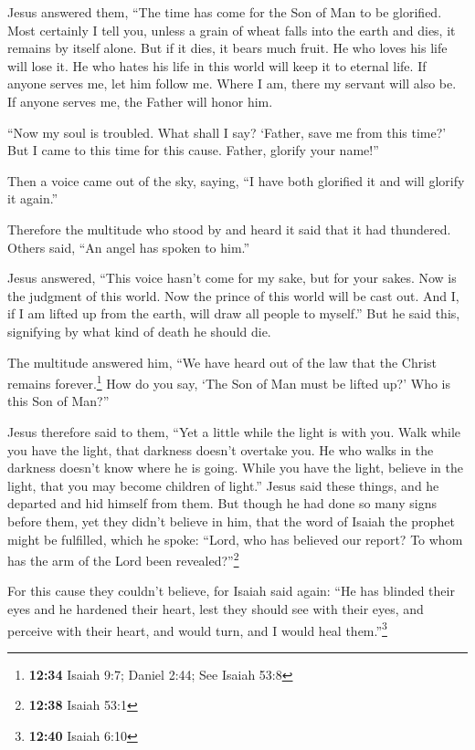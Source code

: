  Jesus answered them, ``The time has come for the Son of
Man to be glorified.  Most certainly I tell you, unless a
grain of wheat falls into the earth and dies, it remains by itself
alone. But if it dies, it bears much fruit.  He who loves
his life will lose it. He who hates his life in this world will keep it
to eternal life.  If anyone serves me, let him follow me.
Where I am, there my servant will also be. If anyone serves me, the
Father will honor him.

 ``Now my soul is troubled. What shall I say? `Father,
save me from this time?' But I came to this time for this cause.
 Father, glorify your name!''

Then a voice came out of the sky, saying, ``I have both glorified it and
will glorify it again.''

 Therefore the multitude who stood by and heard it said
that it had thundered. Others said, ``An angel has spoken to him.''

 Jesus answered, ``This voice hasn't come for my sake,
but for your sakes.  Now is the judgment of this world.
Now the prince of this world will be cast out.  And I, if
I am lifted up from the earth, will draw all people to myself.''
 But he said this, signifying by what kind of death he
should die.

 The multitude answered him, ``We have heard out of the
law that the Christ remains forever.\footnote{\textbf{12:34} Isaiah 9:7;
  Daniel 2:44; See Isaiah 53:8} How do you say, `The Son of Man must be
lifted up?' Who is this Son of Man?''

 Jesus therefore said to them, ``Yet a little while the
light is with you. Walk while you have the light, that darkness doesn't
overtake you. He who walks in the darkness doesn't know where he is
going.  While you have the light, believe in the light,
that you may become children of light.'' Jesus said these things, and he
departed and hid himself from them.  But though he had
done so many signs before them, yet they didn't believe in him,
 that the word of Isaiah the prophet might be fulfilled,
which he spoke: ``Lord, who has believed our report? To whom has the arm
of the Lord been revealed?''\footnote{\textbf{12:38} Isaiah 53:1}

 For this cause they couldn't believe, for Isaiah said
again:  ``He has blinded their eyes and he hardened their
heart, lest they should see with their eyes, and perceive with their
heart, and would turn, and I would heal them.''\footnote{\textbf{12:40}
  Isaiah 6:10}

